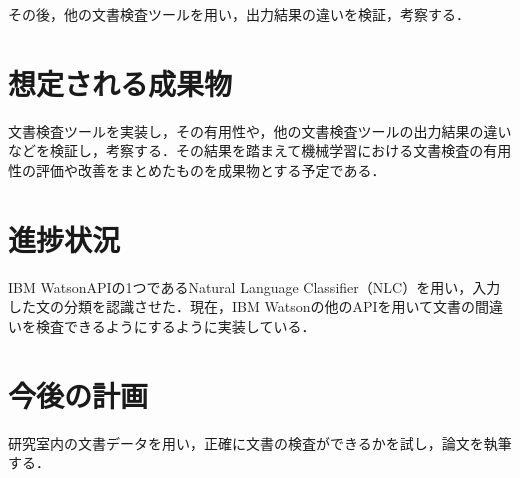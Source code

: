 \documentclass[uplatex,twocolumn,dvipdfmx]{jsarticle}
\begin{document}
その後，他の文書検査ツールを用い，出力結果の違いを検証，考察する．

\section{想定される成果物}
文書検査ツールを実装し，その有用性や，他の文書検査ツールの出力結果の違いなどを検証し，考察する．その結果を踏まえて機械学習における文書検査の有用性の評価や改善をまとめたものを成果物とする予定である．

\section{進捗状況}
IBM WatsonAPIの1つであるNatural Language Classifier（NLC）を用い，入力した文の分類を認識させた．現在，IBM Watsonの他のAPIを用いて文書の間違いを検査できるようにするように実装している．

\section{今後の計画}
研究室内の文書データを用い，正確に文書の検査ができるかを試し，論文を執筆する．


\end{document}
